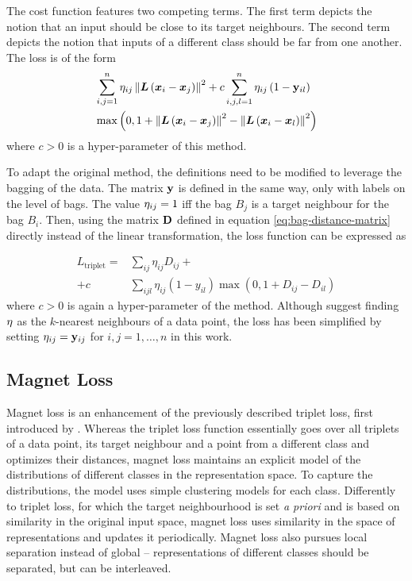 The cost function features two competing terms. The first term depicts the notion that an input should be close to its target neighbours. The second term depicts the notion that inputs of a different class should be far from one another. The loss is of the form
\begin{align*}
	&\sum_{i, j = 1}^n \mathbf{\eta}_{ij} \left\lVert \bm{L} \left( \bm{x}_i - \bm{x}_j \right) \right\rVert^2 + c \sum_{i, j, l = 1}^n \mathbf{\eta}_{ij} \left( 1 - \mathbf{y}_{il} \right) \\
	&\max \left( 0, 1 + \left\lVert \bm{L} \left( \bm{x}_i - \bm{x}_j \right) \right\rVert^2 - \left\lVert \bm{L} \left( \bm{x}_i - \bm{x}_l \right) \right\rVert^2 \right)
\end{align*}
where \( c > 0 \) is a hyper-parameter of this method.

To adapt the original method, the definitions need to be modified to leverage the bagging of the data. The matrix \( \mathbf{y} \) is defined in the same way, only with labels on the level of bags. The value \( \mathbf{\eta}_{ij} = 1 \) iff the bag \( B_j \) is a target neighbour for the bag \( B_i \). Then, using the matrix \( \mathbf{D} \) defined in equation \ref{eq:bag-distance-matrix} directly instead of the linear transformation, the loss function can be expressed as

\begin{align*}
	L_\mathrm{triplet} = &\sum_{ij} \eta_{ij} D_{ij} + \\
	+ c &\sum_{ijl} \eta_{ij} \left( 1 - y_{il} \right) \max \left( 0, 1 + D_{ij} - D_{il} \right)
\end{align*}
where \( c > 0 \) is again a hyper-parameter of the method. Although \cite{weinberger_distance_2006} suggest finding \( \mathbf{\eta} \) as the \( k \)-nearest neighbours of a data point, the loss has been simplified by setting \( \mathbf{\eta}_{ij} = \mathbf{y}_{ij} \) for \( i, j = 1, \dots, n \) in this work.

\subsection{Magnet Loss}
Magnet loss is an enhancement of the previously described triplet loss, first introduced by \cite{rippel_metric_2016}. Whereas the triplet loss function essentially goes over all triplets of a data point, its target neighbour and a point from a different class and optimizes their distances, magnet loss maintains an explicit model of the distributions of different classes in the representation space. To capture the distributions, the model uses simple clustering models for each class. Differently to triplet loss, for which the target neighbourhood is set \textit{a priori} and is based on similarity in the original input space, magnet loss uses similarity in the space of representations and updates it periodically. Magnet loss also pursues local separation instead of global -- representations of different classes should be separated, but can be interleaved.

